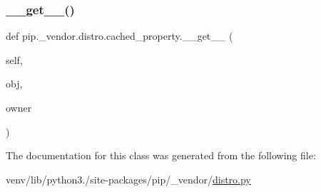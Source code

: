 \subsubsection{\texorpdfstring{\+\_\+\+\_\+get\+\_\+\+\_\+()}{\_\_get\_\_()}}
{\footnotesize\ttfamily def pip.\+\_\+vendor.\+distro.\+cached\+\_\+property.\+\_\+\+\_\+get\+\_\+\+\_\+ (\begin{DoxyParamCaption}\item[{}]{self,  }\item[{}]{obj,  }\item[{}]{owner }\end{DoxyParamCaption})}



The documentation for this class was generated from the following file\+:\begin{DoxyCompactItemize}
\item 
venv/lib/python3./site-\/packages/pip/\+\_\+vendor/\hyperlink{distro_8py}{distro.\+py}\end{DoxyCompactItemize}
